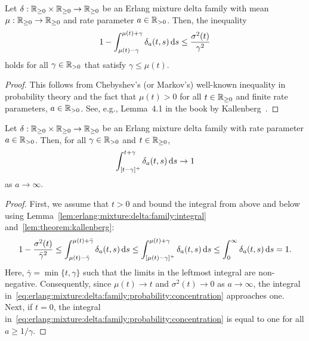 \begin{lemma}\label{lem:theorem:kallenberg}
	Let $\delta: \mathbb{R}_{\geq 0} \times \mathbb{R}_{\geq 0} \rightarrow \mathbb{R}_{\geq 0}$ be an Erlang mixture delta family with mean $\mu: \mathbb{R}_{\geq 0} \rightarrow \mathbb{R}_{\geq 0}$ and rate parameter $a \in \mathbb{R}_{> 0}$. Then, the inequality
	\begin{align}
		1 - \int_{\mu(t) - \gamma}^{\mu(t) + \gamma} \delta_a(t, s) \,\mathrm{d} s \leq \frac{\sigma^2(t)}{\gamma^2}
	\end{align}
	holds for all $\gamma \in \mathbb{R}_{> 0}$ that satisfy $\gamma \leq \mu(t)$.
\end{lemma}
%
\begin{proof}
	This follows from Chebyshev's (or Markov's) well-known inequality in probability theory and the fact that $\mu(t) > 0$ for all $t \in \mathbb{R}_{\geq 0}$ and finite rate parameters, $a \in \mathbb{R}_{> 0}$. See, e.g., Lemma~4.1 in the book by Kallenberg~\cite{Kallenberg:2002}.
\end{proof}
%
\begin{lemma}\label{lem:unit:integral}
	Let $\delta: \mathbb{R}_{\geq 0} \times \mathbb{R}_{\geq 0} \rightarrow \mathbb{R}_{\geq 0}$ be an Erlang mixture delta family with rate parameter $a \in \mathbb{R}_{> 0}$. Then, for all $\gamma \in \mathbb{R}_{> 0}$ and $t \in \mathbb{R}_{\geq 0}$,
	\begin{align}\label{eq:erlang:mixture:delta:family:probability:concentration}
		\int_{[t - \gamma]^+}^{t + \gamma} \delta_a(t, s) \,\mathrm{d} s \rightarrow 1
	\end{align}
	as $a \rightarrow \infty$.
\end{lemma}
%
\begin{proof}
	First, we assume that $t > 0$ and bound the integral from above and below using Lemma~\ref{lem:erlang:mixture:delta:family:integral} and~\ref{lem:theorem:kallenberg}:
	\begin{align}
		1 - \frac{\sigma^2(t)}{\bar \gamma^2} \leq \int_{\mu(t) - \bar \gamma}^{\mu(t) + \bar \gamma} \delta_a(t, s) \,\mathrm{d} s \leq \int_{[\mu(t) - \gamma]^+}^{\mu(t) + \gamma} \delta_a(t, s) \,\mathrm{d} s \leq \int_0^\infty \delta_a(t, s) \,\mathrm{d} s = 1.
	\end{align}
	Here, $\bar \gamma = \min\{t, \gamma\}$ such that the limits in the leftmost integral are non-negative. Consequently, since $\mu(t) \rightarrow t$ and $\sigma^2(t) \rightarrow 0$ as $a \rightarrow \infty$, the integral in~\eqref{eq:erlang:mixture:delta:family:probability:concentration} approaches one. Next, if $t = 0$, the integral in~\eqref{eq:erlang:mixture:delta:family:probability:concentration} is equal to one for all $a \geq 1/\gamma$.
\end{proof}
